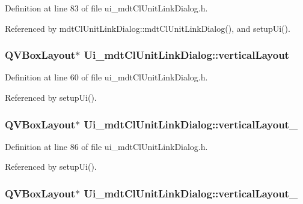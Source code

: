 Definition at line 83 of file ui\-\_\-mdt\-Cl\-Unit\-Link\-Dialog.\-h.



Referenced by mdt\-Cl\-Unit\-Link\-Dialog\-::mdt\-Cl\-Unit\-Link\-Dialog(), and setup\-Ui().

\hypertarget{class_ui__mdt_cl_unit_link_dialog_ad145ca2439a0b474b568006bff51b134}{
\subsubsection[{vertical\-Layout}]{\setlength{\rightskip}{0pt plus 5cm}Q\-V\-Box\-Layout$\ast$ Ui\-\_\-mdt\-Cl\-Unit\-Link\-Dialog\-::vertical\-Layout}}\label{class_ui__mdt_cl_unit_link_dialog_ad145ca2439a0b474b568006bff51b134}


Definition at line 60 of file ui\-\_\-mdt\-Cl\-Unit\-Link\-Dialog.\-h.



Referenced by setup\-Ui().

\hypertarget{class_ui__mdt_cl_unit_link_dialog_a8b2ec4702b83c9892c0b1feff9513c28}{
\subsubsection[{vertical\-Layout\-\_\-2}]{\setlength{\rightskip}{0pt plus 5cm}Q\-V\-Box\-Layout$\ast$ Ui\-\_\-mdt\-Cl\-Unit\-Link\-Dialog\-::vertical\-Layout\-\_}}\label{class_ui__mdt_cl_unit_link_dialog_a8b2ec4702b83c9892c0b1feff9513c28}


Definition at line 86 of file ui\-\_\-mdt\-Cl\-Unit\-Link\-Dialog.\-h.



Referenced by setup\-Ui().

\hypertarget{class_ui__mdt_cl_unit_link_dialog_ad5f9c3ae01fe80b5b3d99176b75e725a}{
\subsubsection[{vertical\-Layout\-\_\-3}]{\setlength{\rightskip}{0pt plus 5cm}Q\-V\-Box\-Layout$\ast$ Ui\-\_\-mdt\-Cl\-Unit\-Link\-Dialog\-::vertical\-Layout\-\_}}\label{class_ui__mdt_cl_unit_link_dialog_ad5f9c3ae01fe80b5b3d99176b75e725a}


